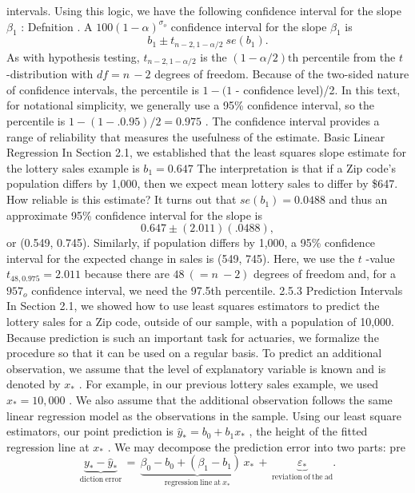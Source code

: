 \documentclass[11pt]{article}
\begin{document}
intervals. Using this logic, we have the following confidence interval for the
 slope \(\beta_{1}\) :
Defnition . A \(1 0 0 ( 1-\alpha)^{\sigma_{o}}\) confidence interval for the slope \(\beta_{1}\) is
\[
b_{1} \pm t_{n-2 , 1-\alpha/ 2} ~ s e ( b_{1} ) . \tag{2.6}
\]
As with hypothesis testing, \(t_{n-2 , 1-\alpha/ 2}\) is the \(( 1-\alpha/ 2 ) \mathrm{t h}\) percentile from the
\(t\) -distribution with \(d f=n \,-2\) degrees of freedom. Because of the two-sided
nature of confidence intervals, the percentile is \(1-( 1\) - confidence level)/2. In
this text, for notational simplicity, we generally use a 95\% confidence interval,
 so the percentile is \(1-( 1-. 0 . 9 5 ) / 2=0 . 9 7 5\) . The confidence interval provides
 a range of reliability that measures the usefulness of the estimate.
 Basic Linear Regression
In Section 2.1, we established that the least squares slope estimate for the
lottery sales example is \(b_{1}=0 . 6 4 7\) The interpretation is that if a Zip code's
 population differs by 1,000, then we expect mean lottery sales to differ by \$647.
How reliable is this estimate? It turns out that \(s e ( b_{1} )=0 . 0 4 8 8\) and thus an
 approximate 95\% confidence interval for the slope is
\[
0 . 6 4 7 \pm( 2 . 0 1 1 ) ( . 0 4 8 8 ) ,
\]
or (0.549, 0.745). Similarly, if population differs by 1,000, a 95\% confidence
interval for the expected change in sales is (549, 745). Here, we use the \(t\) -value
\(t_{4 8 , 0 . 9 7 5}=2 . 0 1 1\) because there are \(4 8 ~ (=n ~-2 )\) degrees of freedom and, for a
\(9 5 7_{o}\) confidence interval, we need the 97.5th percentile.
2.5.3 Prediction Intervals
In Section 2.1, we showed how to use least squares estimators to predict the lottery
sales for a Zip code, outside of our sample, with a population of 10,000. Because
prediction is such an important task for actuaries, we formalize the procedure so
 that it can be used on a regular basis.
 To predict an additional observation, we assume that the level of explanatory
variable is known and is denoted by \(x_{*}\) . For example, in our previous lottery sales
example, we used \(x_{*}=1 0 \mathrm{,} 0 0 0\) . We also assume that the additional observation
 follows the same linear regression model as the observations in the sample.
Using our least square estimators, our point prediction is \(\widehat{y}_{\ast}=b_{0}+b_{1} x_{\ast}\) , the
 height of the fitted regression line at \(x_{*}\) . We may decompose the prediction error
into two parts:
pre
\[
\underbrace{y_{*}-\widehat{y}_{*}}_{\mathrm{d i c t i o n ~ e r r o r}} \,=\, \underbrace{\beta_{0}-b_{0}+( \beta_{1}-b_{1} ) \, x_{*}}_{\mathrm{r e g r e s s i o n ~ l i n e ~ a t ~} x_{*}} \,+\, \underbrace{\varepsilon_{*}}_{\mathrm{r e v i a t i o n ~ o f ~ t h e ~ a d}} .
\]
\end{document}
